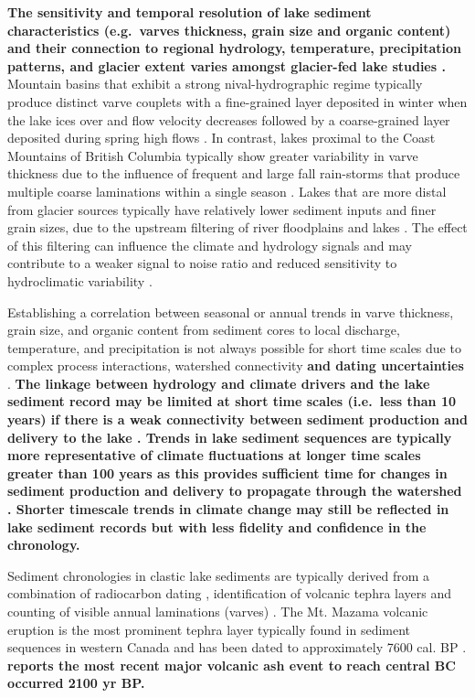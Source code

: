 \documentclass[Royal,times,doublespace,sageh]{sagej}
\begin{document}
\textbf{The sensitivity and temporal resolution of lake sediment
characteristics (e.g.~varves thickness, grain size and organic content)
and their connection to regional hydrology, temperature, precipitation
patterns, and glacier extent varies amongst glacier-fed lake studies
\citep{Desloges1999, Hodder2006b, Leonard1997, Menounos2006b, Menounos2008c}.}
Mountain basins that exhibit a strong nival-hydrographic regime
typically produce distinct varve couplets with a fine-grained layer
deposited in winter when the lake ices over and flow velocity decreases
followed by a coarse-grained layer deposited during spring high flows
\citep[e.g.][]{Leonard1997, Hodder2007c, Desloges1999}. In contrast,
lakes proximal to the Coast Mountains of British Columbia typically show
greater variability in varve thickness due to the influence of frequent
and large fall rain-storms that produce multiple coarse laminations
within a single season \citep[e.g.][]{Gilbert1997, Menounos2008c}. Lakes
that are more distal from glacier sources typically have relatively
lower sediment inputs and finer grain sizes, due to the upstream
filtering of river floodplains and lakes \citep{Hodder2007c}. The effect
of this filtering can influence the climate and hydrology signals and
may contribute to a weaker signal to noise ratio and reduced sensitivity
to hydroclimatic variability \citep{Jerolmack2010}.

Establishing a correlation between seasonal or annual trends in varve
thickness, grain size, and organic content from sediment cores to local
discharge, temperature, and precipitation is not always possible for
short time scales due to complex process interactions, watershed
connectivity \textbf{and dating uncertainties}
\citep{Hodder2007c, Menounos2008c, Heideman2017}. \textbf{The linkage
between hydrology and climate drivers and the lake sediment record may
be limited at short time scales (i.e.~less than 10 years) if there is a
weak connectivity between sediment production and delivery to the lake
\citep{Hodder2007c, Menounos2008c, Heideman2017}. Trends in lake
sediment sequences are typically more representative of climate
fluctuations at longer time scales greater than 100 years as this
provides sufficient time for changes in sediment production and delivery
to propagate through the watershed
\citep{Leonard1999, Osborn2007, Heideman2017}. Shorter timescale trends
in climate change may still be reflected in lake sediment records but
with less fidelity and confidence in the chronology.}

Sediment chronologies in clastic lake sediments are typically derived
from a combination of radiocarbon dating
\citep{Gilbert2012, Hodder2006b, Steinman2019}, identification of
volcanic tephra layers \citep{Gilbert2012, Hodder2006b, Steinman2019}
and counting of visible annual laminations (varves)
\citep{Hodder2006b, Heideman2015}. The Mt. Mazama volcanic eruption is
the most prominent tephra layer typically found in sediment sequences in
western Canada \citep{Gilbert2012, Steinman2019} and has been dated to
approximately 7600 cal. BP \citep{Zdanowicz1999, Hallett1997}.
\textbf{\citet{Westgate1977} reports the most recent major volcanic ash
event to reach central BC occurred 2100 yr BP.}
\end{document}
